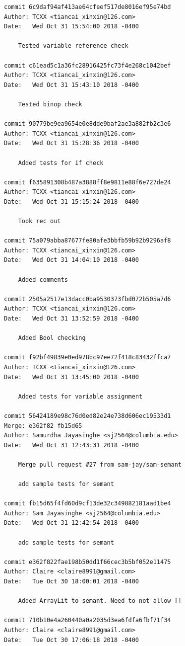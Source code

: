\documentclass[12pt]{article}
\begin{document}
\begin{lstlisting}
commit 6c9daf94af413ae64cfeef517de8016ef95e74bd
Author: TCXX <tiancai_xinxin@126.com>
Date:   Wed Oct 31 15:54:00 2018 -0400

    Tested variable reference check

commit c61ead5c1a36fc28916425fc73f4e268c1042bef
Author: TCXX <tiancai_xinxin@126.com>
Date:   Wed Oct 31 15:43:10 2018 -0400

    Tested binop check

commit 90779be9ea9654e0e8dde9baf2ae3a882fb2c3e6
Author: TCXX <tiancai_xinxin@126.com>
Date:   Wed Oct 31 15:28:36 2018 -0400

    Added tests for if check

commit f635891308b487a3888ff8e9811e88f6e727de24
Author: TCXX <tiancai_xinxin@126.com>
Date:   Wed Oct 31 15:15:24 2018 -0400

    Took rec out

commit 75a079abba87677fe80afe3bbfb59b92b9296af8
Author: TCXX <tiancai_xinxin@126.com>
Date:   Wed Oct 31 14:04:10 2018 -0400

    Added comments

commit 2505a2517e13dacc0ba9530373fbd072b505a7d6
Author: TCXX <tiancai_xinxin@126.com>
Date:   Wed Oct 31 13:52:59 2018 -0400

    Added Bool checking

commit f92bf49839e0ed978bc97ee72f418c83432ffca7
Author: TCXX <tiancai_xinxin@126.com>
Date:   Wed Oct 31 13:45:00 2018 -0400

    Added tests for variable assignment

commit 56424189e98c76d0ed82e24e738d606ec19533d1
Merge: e362f82 fb15d65
Author: Samurdha Jayasinghe <sj2564@columbia.edu>
Date:   Wed Oct 31 12:43:31 2018 -0400

    Merge pull request #27 from sam-jay/sam-semant
    
    add sample tests for semant

commit fb15d65f4fd60d9cf13de32c349882181aad1be4
Author: Sam Jayasinghe <sj2564@columbia.edu>
Date:   Wed Oct 31 12:42:54 2018 -0400

    add sample tests for semant

commit e362f822fae198b50dd1f66cec3b5bf052e11475
Author: Claire <claire8991@gmail.com>
Date:   Tue Oct 30 18:00:01 2018 -0400

    Added ArrayLit to semant. Need to not allow []

commit 710b10e4a260440a0a2035d3ea6fdfa6fbf71f34
Author: Claire <claire8991@gmail.com>
Date:   Tue Oct 30 17:06:18 2018 -0400


\end{lstlisting}
\end{document}

